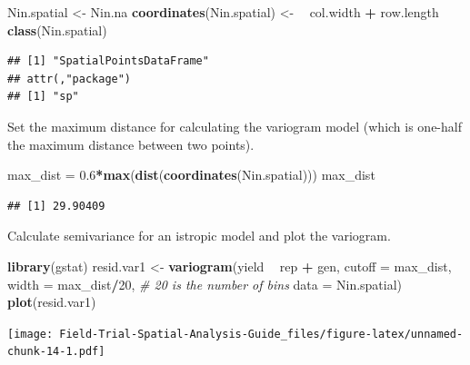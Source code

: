 \documentclass[]{book}
\newenvironment{Shaded}{\begin{snugshade}}{\end{snugshade}}
\newcommand{\CommentTok}[1]{\textcolor[rgb]{0.56,0.35,0.01}{\textit{#1}}}
\newcommand{\DataTypeTok}[1]{\textcolor[rgb]{0.13,0.29,0.53}{#1}}
\newcommand{\DecValTok}[1]{\textcolor[rgb]{0.00,0.00,0.81}{#1}}
\newcommand{\ErrorTok}[1]{\textcolor[rgb]{0.64,0.00,0.00}{\textbf{#1}}}
\newcommand{\FloatTok}[1]{\textcolor[rgb]{0.00,0.00,0.81}{#1}}
\newcommand{\KeywordTok}[1]{\textcolor[rgb]{0.13,0.29,0.53}{\textbf{#1}}}
\newcommand{\NormalTok}[1]{#1}
\newcommand{\OperatorTok}[1]{\textcolor[rgb]{0.81,0.36,0.00}{\textbf{#1}}}
\newcommand{\StringTok}[1]{\textcolor[rgb]{0.31,0.60,0.02}{#1}}
\begin{document}
\begin{Shaded}
\begin{Highlighting}[]
\NormalTok{Nin.spatial <-}\StringTok{ }\NormalTok{Nin.na}
\KeywordTok{coordinates}\NormalTok{(Nin.spatial) <-}\StringTok{ }\ErrorTok{~}\StringTok{ }\NormalTok{col.width }\OperatorTok{+}\StringTok{ }\NormalTok{row.length}
\KeywordTok{class}\NormalTok{(Nin.spatial)}
\end{Highlighting}
\end{Shaded}

\begin{verbatim}
## [1] "SpatialPointsDataFrame"
## attr(,"package")
## [1] "sp"
\end{verbatim}

Set the maximum distance for calculating the variogram model (which is one-half the maximum distance between two points).

\begin{Shaded}
\begin{Highlighting}[]
\NormalTok{max_dist =}\StringTok{ }\FloatTok{0.6}\OperatorTok{*}\KeywordTok{max}\NormalTok{(}\KeywordTok{dist}\NormalTok{(}\KeywordTok{coordinates}\NormalTok{(Nin.spatial)))}
\NormalTok{max_dist}
\end{Highlighting}
\end{Shaded}

\begin{verbatim}
## [1] 29.90409
\end{verbatim}

Calculate semivariance for an istropic model and plot the variogram.

\begin{Shaded}
\begin{Highlighting}[]
\KeywordTok{library}\NormalTok{(gstat)}
\NormalTok{resid.var1 <-}\StringTok{ }\KeywordTok{variogram}\NormalTok{(yield }\OperatorTok{~}\StringTok{ }\NormalTok{rep }\OperatorTok{+}\StringTok{ }\NormalTok{gen, }
                        \DataTypeTok{cutoff =}\NormalTok{ max_dist,}
                        \DataTypeTok{width =}\NormalTok{ max_dist}\OperatorTok{/}\DecValTok{20}\NormalTok{, }\CommentTok{# 20 is the number of bins}
                        \DataTypeTok{data =}\NormalTok{ Nin.spatial)}
\KeywordTok{plot}\NormalTok{(resid.var1)}
\end{Highlighting}
\end{Shaded}

\texttt{[image: Field-Trial-Spatial-Analysis-Guide\_files/figure-latex/unnamed-chunk-14-1.pdf]}
\end{document}
